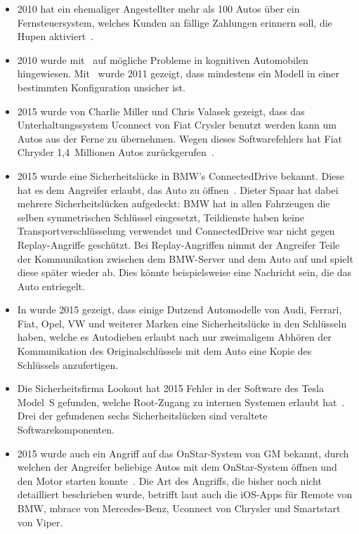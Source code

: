 \begin{itemize}
    \item 2010 hat ein ehemaliger Angestellter mehr als 100 Autos über ein
Fernsteuersystem, welches Kunden an fällige Zahlungen erinnern soll, die Hupen
aktiviert~\cite{Poulsen2010}.
    \item 2010 wurde mit~\cite{Koscher2010} auf mögliche Probleme in kognitiven
Automobilen hingewiesen. Mit~\cite{Checkoway2011} wurde 2011 gezeigt, dass
mindestens ein Modell in einer bestimmten Konfiguration unsicher ist.
    \item  2015
wurde von Charlie Miller und Chris Valasek gezeigt, dass das
Unterhaltungssystem Uconnect von Fiat Crysler benutzt werden kann um Autos aus
der Ferne zu übernehmen. Wegen dieses Softwarefehlers hat Fiat Chrysler
1,4~Millionen Autos zurückgerufen~\cite{Gallagher2015}.
    \item 2015 wurde eine Sicherheitslücke in BMW's ConnectedDrive bekannt. Diese hat
es dem Angreifer erlaubt, das Auto zu öffnen~\cite{Spaar2015}. Dieter Spaar
hat dabei mehrere Sicherheitslücken aufgedeckt: BMW hat in allen Fahrzeugen
die selben symmetrischen Schlüssel eingesetzt, Teildienste haben keine
Transportverschlüsselung verwendet und ConnectedDrive war nicht gegen
Replay-Angriffe geschützt. Bei Replay-Angriffen nimmt der Angreifer Teile der
Kommunikation zwischen dem BMW-Server und dem Auto auf und spielt diese
später wieder ab. Dies könnte beispielsweise eine Nachricht sein, die das
Auto entriegelt.
    \item In \cite{Verdult2015} wurde 2015 gezeigt, dass einige Dutzend Automodelle von
Audi, Ferrari, Fiat, Opel, VW und weiterer Marken eine Sicherheitslücke in den
Schlüsseln haben, welche es Autodieben erlaubt nach nur zweimaligem Abhören der
Kommunikation des Originalschlüssels mit dem Auto eine Kopie des Schlüssels
anzufertigen.
    \item Die Sicherheitsfirma Lookout hat 2015 Fehler in der Software des Tesla Model~S
gefunden, welche Root-Zugang zu internen Systemen erlaubt hat~\cite{Mahaffey2015}.
Drei der gefundenen sechs Sicherheitslücken sind veraltete Softwarekomponenten.
    \item 2015 wurde auch ein Angriff auf das OnStar-System von GM bekannt, durch welchen
der Angreifer beliebige Autos mit dem OnStar-System öffnen und den Motor
starten konnte~\cite{Stevens2015}. Die Art des Angriffs, die bisher noch nicht
detailliert beschrieben wurde, betrifft laut \cite{Greenberg2015} auch die
iOS-Apps für Remote von BMW, mbrace von Mercedes-Benz, Uconnect von Chrysler
und Smartstart von Viper.
\end{itemize}













